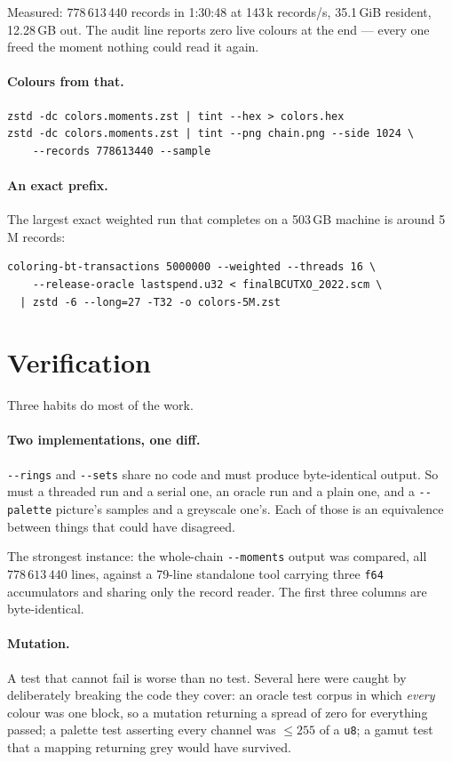 \documentclass[11pt,a4paper]{article}
\newcommand{\flag}[1]{\texttt{-{}-#1}}
\begin{document}
Measured: $778\,613\,440$ records in 1:30:48 at 143\,k records/s, 35.1\,GiB
resident, 12.28\,GB out. The audit line reports zero live colours at the end ---
every one freed the moment nothing could read it again.

\paragraph{Colours from that.}

\begin{lstlisting}
zstd -dc colors.moments.zst | tint --hex > colors.hex
zstd -dc colors.moments.zst | tint --png chain.png --side 1024 \
    --records 778613440 --sample
\end{lstlisting}

\paragraph{An exact prefix.} The largest exact weighted run that completes on a
503\,GB machine is around 5\,M records:

\begin{lstlisting}
coloring-bt-transactions 5000000 --weighted --threads 16 \
    --release-oracle lastspend.u32 < finalBCUTXO_2022.scm \
  | zstd -6 --long=27 -T32 -o colors-5M.zst
\end{lstlisting}

\section{Verification}

Three habits do most of the work.

\paragraph{Two implementations, one diff.} \flag{rings} and \flag{sets} share no
code and must produce byte-identical output. So must a threaded run and a serial
one, an oracle run and a plain one, and a \flag{palette} picture's samples and a
greyscale one's. Each of those is an equivalence between things that could have
disagreed.

The strongest instance: the whole-chain \flag{moments} output was compared, all
$778\,613\,440$ lines, against a 79-line standalone tool carrying three
\texttt{f64} accumulators and sharing only the record reader. The first three
columns are byte-identical.

\paragraph{Mutation.} A test that cannot fail is worse than no test. Several
here were caught by deliberately breaking the code they cover: an oracle test
corpus in which \emph{every} colour was one block, so a mutation returning a
spread of zero for everything passed; a palette test asserting every channel was
$\le 255$ of a \texttt{u8}; a gamut test that a mapping returning grey would have
survived.
\end{document}
